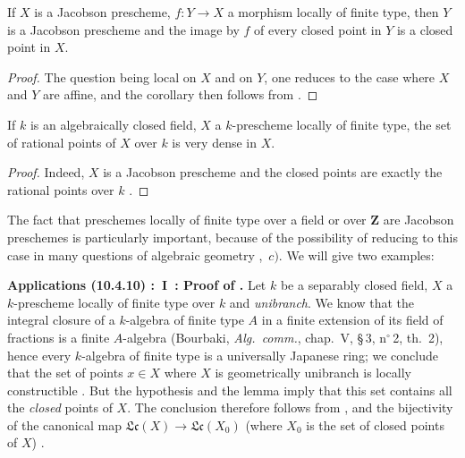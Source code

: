 \begin{corollary}[10.4.7]
\label{IV.10.4.7}
If $X$ is a Jacobson prescheme, $f:Y\to X$ a morphism locally of finite type, then $Y$ is a Jacobson prescheme and the image by $f$ of every closed point in $Y$ is a closed point in $X$.
\end{corollary}

\begin{proof}
The question being local on $X$ and on $Y$, one reduces to the case where $X$ and $Y$ are affine, and the corollary then follows from .
\end{proof}

\begin{corollary}[10.4.8]
\label{IV.10.4.8}
If $k$ is an algebraically closed field, $X$ a $k$-prescheme locally of finite type, the set of rational points of $X$ over $k$ is very dense in $X$.
\end{corollary}

\begin{proof}
Indeed, $X$ is a Jacobson prescheme  and the closed points are exactly the rational points over $k$ .
\end{proof}

\begin{env}[10.4.9]
\label{IV.10.4.9}
The fact that preschemes locally of finite type over a field or over $\mathbf{Z}$ are Jacobson preschemes is particularly important, because of the possibility of reducing to this case in many questions of algebraic geometry ,~$c)$.
We will give two examples:
\end{env}

\begin{env}[10.4.10]
\label{IV.10.4.10}
\textbf{Applications (10.4.10) :~I~: Proof of .}
Let $k$ be a separably closed field, $X$ a $k$-prescheme locally of finite type over $k$ and \emph{unibranch}.
We know that the integral closure of a $k$-algebra of finite type $A$ in a finite extension of its field of fractions is a finite $A$-algebra (Bourbaki, \emph{Alg.\ comm.}, chap.~V, \S\,3, n$^\circ$\,2, th.~2), hence every $k$-algebra of finite type is a universally Japanese ring; we conclude that the set of points $x\in X$ where $X$ is geometrically unibranch is locally constructible .
But the hypothesis and the lemma  imply that this set contains all the \emph{closed} points of $X$.
The conclusion therefore follows from ,  and the bijectivity of the canonical map $\mathfrak{Lc}(X)\to\mathfrak{Lc}(X_0)$ (where $X_0$ is the set of closed points of $X$) .
\end{env}

